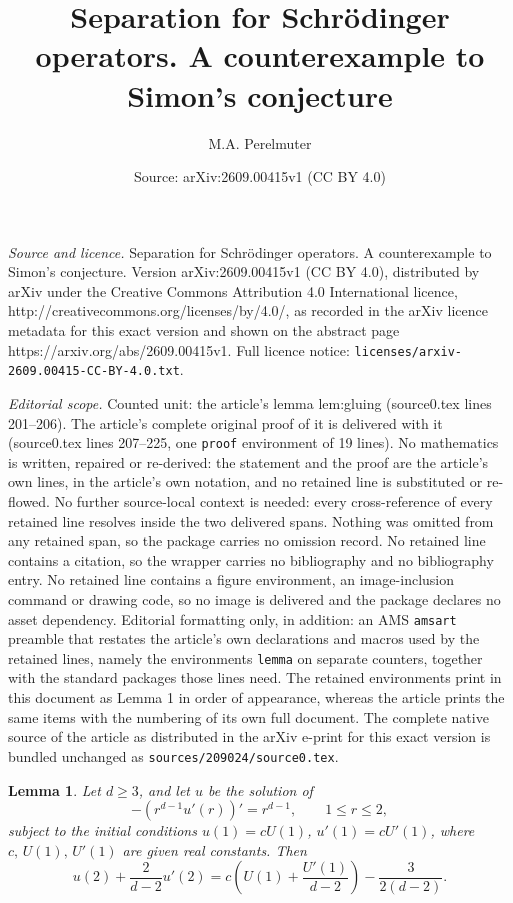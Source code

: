\documentclass[10pt,a4paper]{amsart}
\title{Separation for Schr\"odinger operators. A counterexample to Simon's conjecture}
\author{M.A. Perelmuter}
\date{Source: arXiv:2609.00415v1 (CC BY 4.0)}
\newtheorem{lemma}{Lemma}
\begin{document}
\maketitle

\noindent\emph{Source and licence.} Separation for Schr\"odinger operators. A counterexample to Simon's conjecture. Version arXiv:2609.00415v1 (CC BY 4.0), distributed by arXiv under the Creative Commons Attribution 4.0 International licence, http://creativecommons.org/licenses/by/4.0/, as recorded in the arXiv licence metadata for this exact version and shown on the abstract page https://arxiv.org/abs/2609.00415v1. Full licence notice: \texttt{licenses/arxiv-2609.00415-CC-BY-4.0.txt}.\par\smallskip

\noindent\textit{Editorial scope.} Counted unit: the article's lemma lem:gluing (source0.tex lines 201--206). The article's complete original proof of it is delivered with it (source0.tex lines 207--225, one \texttt{proof} environment of 19 lines). No mathematics is written, repaired or re-derived: the statement and the proof are the article's own lines, in the article's own notation, and no retained line is substituted or re-flowed.  No further source-local context is needed: every cross-reference of every retained line resolves inside the two delivered spans.  Nothing was omitted from any retained span, so the package carries no omission record.  No retained line contains a citation, so the wrapper carries no bibliography and no bibliography entry.  No retained line contains a figure environment, an image-inclusion command or drawing code, so no image is delivered and the package declares no asset dependency.  Editorial formatting only, in addition: an AMS \texttt{amsart} preamble that restates the article's own declarations and macros used by the retained lines, namely the environments \texttt{lemma} on separate counters, together with the standard packages those lines need.  The retained environments print in this document as Lemma 1 in order of appearance, whereas the article prints the same items with the numbering of its own full document.  The complete native source of the article as distributed in the arXiv e-print for this exact version is bundled unchanged as \texttt{sources/209024/source0.tex}.
\begin{lemma}\label{lem:gluing}
Let $d\ge 3$, and let $u$ be the solution of
$$-\left(r^{d-1}u'(r)\right)'=r^{d-1},\qquad 1\le r\le 2,$$
subject to the initial conditions $u(1)=cU(1)$, $u'(1)=cU'(1)$, where $c,\,U(1),\,U'(1)$ are given real constants. Then
$$u(2)+\frac{2}{d-2}u'(2)=c\left(U(1)+\frac{U'(1)}{d-2}\right)-\frac{3}{2(d-2)}.$$
\end{lemma}
\end{document}

